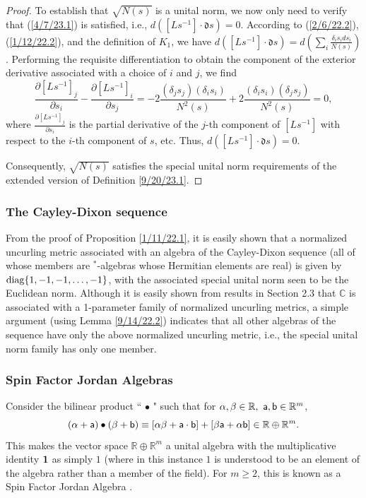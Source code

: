 \documentclass{amsart}
\numberwithin{equation}{section}
\theoremstyle{definition}
\numberwithin{theorem}{section}
\begin{document}
\begin{proof}
 To establish that $\sqrt{N(s)}$ is a unital norm, we  now only need to verify that (\ref{4/7/23.1}) is satisfied, i.e., $d\left([Ls^{-1}]\cdot \mathfrak{d}s\right)=0$.  According to (\ref{2/6/22.2}), (\ref{1/12/22.2}), and the definition  of $K_1$, we have $d\left([Ls^{-1}]\cdot \mathfrak{d}s\right) = d\left(\sum_i \frac{\delta_is_i ds_i}{N(s)}\right)$.  Performing the requisite differentiation to obtain the component of the exterior derivative associated with a choice of $i$ and $j$, we find \[ \frac{\partial [Ls^{-1}]_j}{\partial s_i} - \frac{\partial [Ls^{-1}]_i}{\partial s_j} = -2\frac{(\delta_j s_j)(\delta_i s_i)}{N^2(s)} +
2\frac{(\delta_i s_i)(\delta_j s_j)}{N^2(s)} = 0,  \] where $\frac{\partial [Ls^{-1}]_j}{\partial s_i}$ is the partial derivative of the $j$-th component of $[Ls^{-1}]$ with respect to the $i$-th component of $s$, etc. Thus,  $d\left([Ls^{-1}]\cdot \mathfrak{d}s\right) = 0$.

Consequently, $\sqrt{N(s)}$ satisfies the special unital norm requirements of the extended version of Definition \ref{9/20/23.1}.  
\end{proof}


\subsubsection{The Cayley-Dixon sequence}  From the proof of Proposition \ref{1/11/22.1}, it is easily shown that a normalized uncurling metric associated with an algebra of the Cayley-Dixon sequence (all of whose members are $^*$-algebras whose Hermitian elements are real) is given by ${\rm diag}\{1,-1,-1,\dots,-1\}$, with the associated special unital norm seen to be the Euclidean norm. Although it is easily shown from results in Section 2.3 that $\mathbb{C}$ is associated with a 1-parameter family of normalized uncurling metrics, a simple argument (using Lemma \ref{9/14/22.2}) indicates that all other algebras of the sequence have only the above normalized uncurling metric, i.e., the special unital norm family has only one member.  
 
\subsubsection{Spin Factor Jordan Algebras}  Consider the bilinear product ``$\,\bullet\,$" such that for
$\alpha,\beta\in \mathbb{R},\,\, {\sf a},{\sf b}\in \mathbb{R}^m$,  \begin{equation}  (\alpha+ {\sf a})\bullet (\beta + {\sf b}) \equiv
    [\alpha \beta + {\sf a} \cdot {\sf b}] + [ \beta {\sf a} + \alpha {\sf b}] \in \mathbb{R}\oplus \mathbb{R}^m. \label{12/24/18.1}\end{equation}  This makes the vector space $\mathbb{R}\oplus \mathbb{R}^m$ a unital algebra with the multiplicative identity ${\bf 1}$ as simply $1$ (where in this instance $1$ is understood to be an element of the algebra rather than a member of the field).  For $m\ge 2$, this is known as a Spin Factor Jordan Algebra \cite{mccrimmon:2004}.
\end{document}

